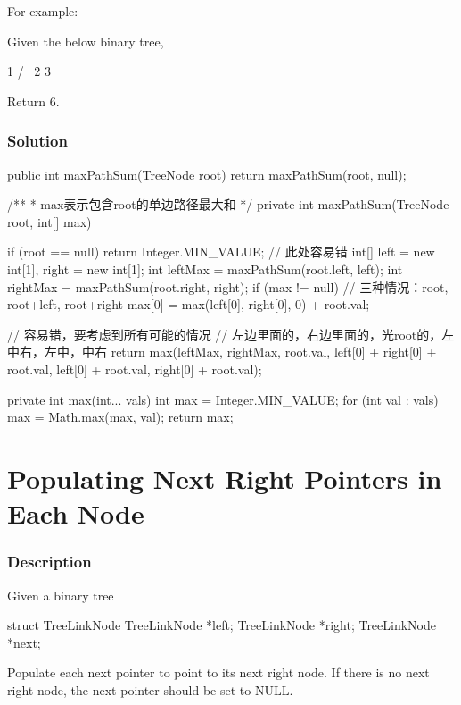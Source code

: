 For example:

Given the below binary tree,
\begin{Code}
       1
      / \
     2   3
\end{Code}

Return 6.

\subsubsection{Solution}

\begin{Code}
public int maxPathSum(TreeNode root) {
    return maxPathSum(root, null);
}

/**
 * max表示包含root的单边路径最大和
 */
private int maxPathSum(TreeNode root, int[] max) {
    if (root == null) {
        return Integer.MIN_VALUE;  // 此处容易错
    }
    int[] left = new int[1], right = new int[1];
    int leftMax = maxPathSum(root.left, left);
    int rightMax = maxPathSum(root.right, right);
    if (max != null) {
        // 三种情况：root, root+left, root+right
        max[0] = max(left[0], right[0], 0) + root.val;
    }

    // 容易错，要考虑到所有可能的情况
    // 左边里面的，右边里面的，光root的，左中右，左中，中右
    return max(leftMax, rightMax, root.val, left[0] + right[0] + root.val,
            left[0] + root.val, right[0] + root.val);
}

private int max(int... vals) {
    int max = Integer.MIN_VALUE;
    for (int val : vals) {
        max = Math.max(max, val);
    }
    return max;
}
\end{Code}

\newpage

\section{Populating Next Right Pointers in Each Node} %

\subsubsection{Description}

Given a binary tree
\begin{Code}
    struct TreeLinkNode {
      TreeLinkNode *left;
      TreeLinkNode *right;
      TreeLinkNode *next;
    }
\end{Code}

Populate each next pointer to point to its next right node. If there is no next right node, the next pointer should be set to NULL.

